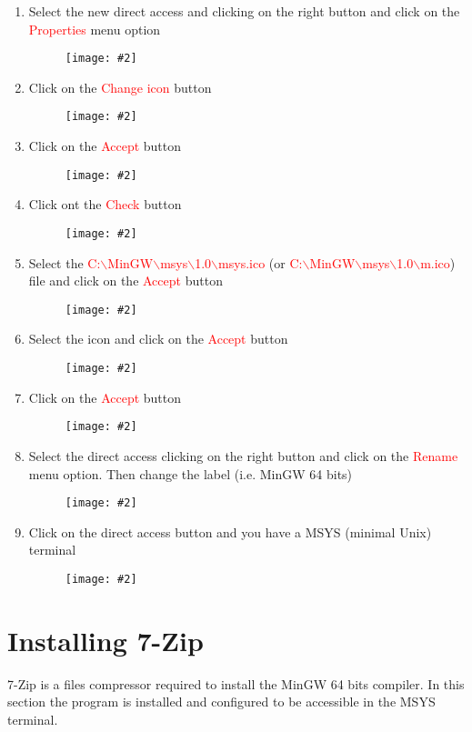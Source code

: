 \documentclass[a4paper]{article}
\newcommand{\FIG}[2]
{
	\begin{figure}[ht!]
	\centering
	\texttt{[image: \#2]}
	\end{figure}
}
\newcommand{\FIGURE}[1]{\FIG{0.35}{#1}}
\newcommand{\RED}[1] {\textcolor{red}{#1}}
\begin{document}
\begin{enumerate}
\item Select the new direct access and clicking on the right button and click on
the \RED{Properties} menu option
\FIGURE{msys-13.png}

\item Click on the \RED{Change icon} button
\FIGURE{msys-14.png}

\clearpage

\item Click on the \RED{Accept} button
\FIGURE{msys-15.png}

\item Click ont the \RED{Check} button
\FIGURE{msys-16.png}

\clearpage

\item Select the
\RED{C:$\backslash$MinGW$\backslash$msys$\backslash$1.0$\backslash$msys.ico} (or
\RED{C:$\backslash$MinGW$\backslash$msys$\backslash$1.0$\backslash$m.ico}) file
and click on the \RED{Accept} button
\FIGURE{msys-17.png}

\item Select the icon and click on the \RED{Accept} button
\FIGURE{msys-18.png}

\clearpage

\item Click on the \RED{Accept} button
\FIGURE{msys-19.png}

\item Select the direct access clicking on the right button and click on the
\RED{Rename} menu option. Then change the label (i.e. MinGW 64 bits)
\FIGURE{msys-20.png}

\clearpage

\item Click on the direct access button and you have a MSYS (minimal Unix)
terminal
\FIGURE{msys-21.png}

\end{enumerate}

\clearpage

\section{Installing 7-Zip}

7-Zip is a files compressor required to install the MinGW 64 bits compiler. In
this section the program is installed and configured to be accessible in the
MSYS terminal.
\end{document}
